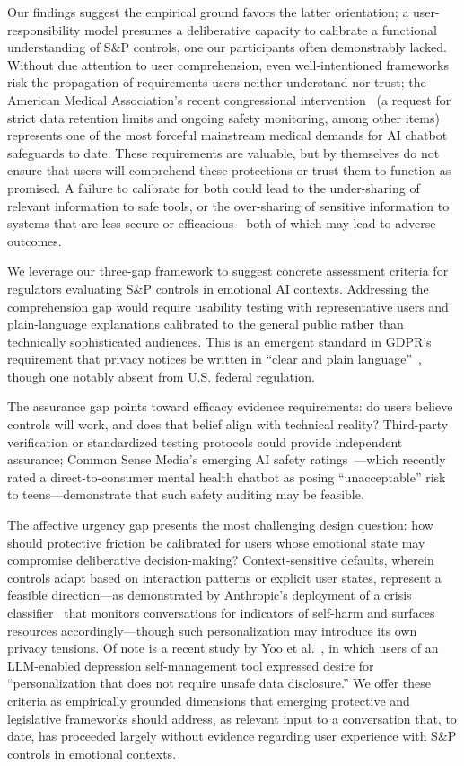 \documentclass[letterpaper,twocolumn,10pt]{article}
\begin{document}
Our findings suggest the empirical ground favors the latter orientation; a user-responsibility model presumes a deliberative capacity to calibrate a functional understanding of S\&P controls, one our participants often demonstrably lacked. Without due attention to user comprehension, even well-intentioned frameworks risk the propagation of requirements users neither understand nor trust; the American Medical Association's recent congressional intervention~\cite{ama2026chatbots} (a request for strict data retention limits and ongoing safety monitoring, among other items) represents one of the most forceful mainstream medical demands for AI chatbot safeguards to date. These requirements are valuable, but by themselves do not ensure that users will comprehend these protections or trust them to function as promised. A failure to calibrate for both could lead to the under-sharing of relevant information to safe tools, or the over-sharing of sensitive information to systems that are less secure or efficacious---both of which may lead to adverse outcomes. 

We leverage our three-gap framework to suggest concrete assessment criteria for regulators evaluating S\&P controls in emotional AI contexts. Addressing the comprehension gap would require usability testing with representative users and plain-language explanations calibrated to the general public rather than technically sophisticated audiences. This is an emergent standard in GDPR's requirement that privacy notices be written in ``clear and plain language''~\cite{gdpr2016art12}, though one notably absent from U.S. federal regulation. 

The assurance gap points toward efficacy evidence requirements: do users believe controls will work, and does that belief align with technical reality? Third-party verification or standardized testing protocols could provide independent assurance; Common Sense Media's emerging AI safety ratings~\cite{csm2026airatings}---which recently rated a direct-to-consumer mental health chatbot as posing ``unacceptable'' risk to teens---demonstrate that such safety auditing may be feasible. 

The affective urgency gap presents the most challenging design question: how should protective friction be calibrated for users whose emotional state may compromise deliberative decision-making? Context-sensitive defaults, wherein controls adapt based on interaction patterns or explicit user states, represent a feasible direction---as demonstrated by Anthropic's deployment of a crisis classifier~\cite{anthropic2026wellbeing} that monitors conversations for indicators of self-harm and surfaces resources accordingly---though such personalization may introduce its own privacy tensions. Of note is a recent study by Yoo et al.~\cite{yoo2026personalization}, in which users of an LLM-enabled depression self-management tool expressed desire for ``personalization that does not require unsafe data disclosure.'' We offer these criteria as empirically grounded dimensions that emerging protective and legislative frameworks should address, as relevant input to a conversation that, to date, has proceeded largely without evidence regarding user experience with S\&P controls in emotional contexts.
\end{document}
